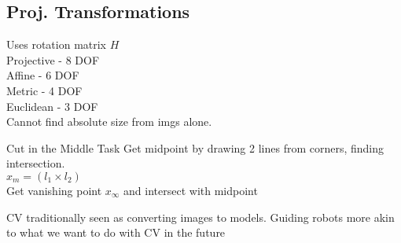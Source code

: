 \documentclass{article}
\begin{document}
\subsection{Proj. Transformations}
Uses rotation matrix $H$\\
Projective - 8 DOF \\
Affine - 6 DOF \\
Metric - 4 DOF \\
Euclidean - 3 DOF 
\\
Cannot find absolute size from imgs alone.
\begin{example}{Cut in the Middle Task}{}
  Get midpoint by drawing 2 lines from corners, finding intersection. \\
  $x_m = (l_1 \times l_2)$\\
  Get vanishing point $x_\infty$ and intersect with midpoint
\end{example}

CV traditionally seen as converting images to models. Guiding robots more akin to what we want to do with CV in the future
\end{document}
